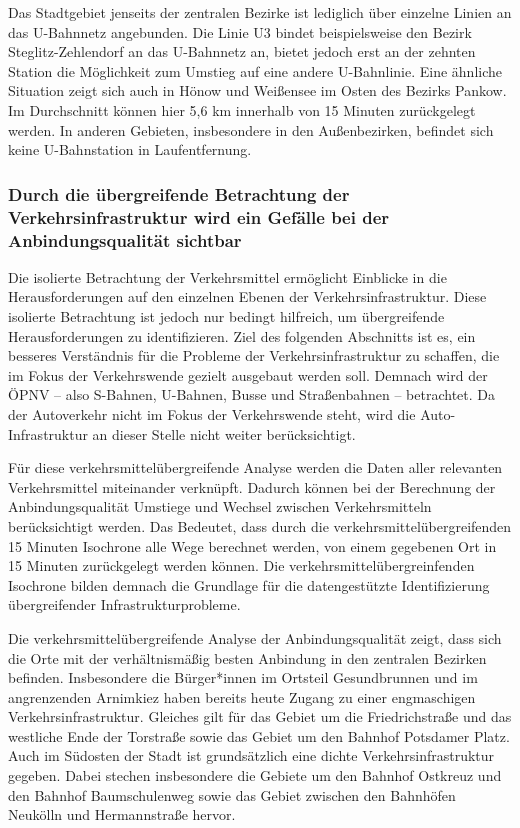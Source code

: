 
Das Stadtgebiet jenseits der zentralen Bezirke ist lediglich über einzelne Linien an das U-Bahnnetz angebunden. Die Linie U3 bindet beispielsweise den Bezirk Steglitz-Zehlendorf an das U-Bahnnetz an, bietet jedoch erst an der zehnten Station die Möglichkeit zum Umstieg auf eine andere U-Bahnlinie. Eine ähnliche Situation zeigt sich auch in Hönow und Weißensee im Osten des Bezirks Pankow. Im Durchschnitt können hier 5,6 km innerhalb von 15 Minuten zurückgelegt werden. In anderen Gebieten, insbesondere in den Außenbezirken, befindet sich keine U-Bahnstation in Laufentfernung.


\subsubsection{Durch die übergreifende Betrachtung der Verkehrsinfrastruktur wird ein Gefälle bei der Anbindungsqualität sichtbar}
Die isolierte Betrachtung der Verkehrsmittel ermöglicht Einblicke in die Herausforderungen auf den einzelnen Ebenen der Verkehrsinfrastruktur. Diese isolierte Betrachtung ist jedoch nur bedingt hilfreich, um übergreifende Herausforderungen zu identifizieren. Ziel des folgenden Abschnitts ist es, ein besseres Verständnis für die Probleme der Verkehrsinfrastruktur zu schaffen, die im Fokus der Verkehrswende gezielt ausgebaut werden soll. Demnach wird der ÖPNV – also S-Bahnen, U-Bahnen, Busse und Straßenbahnen – betrachtet. Da der Autoverkehr nicht im Fokus der Verkehrswende steht, wird die Auto-Infrastruktur an dieser Stelle nicht weiter berücksichtigt.

Für diese verkehrsmittelübergreifende Analyse werden die Daten aller relevanten Verkehrsmittel miteinander verknüpft. Dadurch können bei der Berechnung der Anbindungsqualität Umstiege und Wechsel zwischen Verkehrsmitteln berücksichtigt werden. Das Bedeutet, dass durch die verkehrsmittelübergreifenden 15 Minuten Isochrone alle Wege berechnet werden, von einem gegebenen Ort in 15 Minuten zurückgelegt werden können. Die verkehrsmittelübergreinfenden Isochrone bilden demnach die Grundlage für die datengestützte Identifizierung übergreifender Infrastrukturprobleme.


Die verkehrsmittelübergreifende Analyse der Anbindungsqualität zeigt, dass sich die Orte mit der verhältnismäßig besten Anbindung in den zentralen Bezirken befinden. Insbesondere die Bürger*innen im Ortsteil Gesundbrunnen und im angrenzenden Arnimkiez haben bereits heute Zugang zu einer engmaschigen Verkehrsinfrastruktur. Gleiches gilt für das Gebiet um die Friedrichstraße und das westliche Ende der Torstraße sowie das Gebiet um den Bahnhof Potsdamer Platz. Auch im Südosten der Stadt ist grundsätzlich eine dichte Verkehrsinfrastruktur gegeben. Dabei stechen insbesondere die Gebiete um den Bahnhof Ostkreuz und den Bahnhof Baumschulenweg sowie das Gebiet zwischen den Bahnhöfen Neukölln und Hermannstraße hervor.

